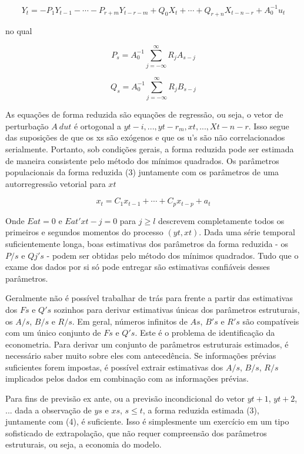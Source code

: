 \documentclass[12pt]{article}
\begin{document}
\begin{equation}
    Y_t = -P_1 Y_{t-1} - \cdots - P_{r+m} Y_{t-r-m} + Q_0 X_t + \cdots + Q_{r+n} X_{t-n-r} + A_0^{-1} u_t
\end{equation}

no qual 

\[
P_s = A_0^{-1} \sum_{j=-\infty}^{\infty} R_j A_{s-j}
\]

\[
Q_s = A_0^{-1} \sum_{j=-\infty}^{\infty} R_j B_{s-j}
\]

As equações de forma reduzida são equações de regressão, ou seja, o vetor de perturbação $A~dut$ é ortogonal a $yt- i , ..., yt-r_m,xt , ..., Xt-n-r$. Isso segue das suposições de que os xs são exógenos e que os u's são não correlacionados serialmente. Portanto, sob condições gerais, a forma reduzida pode ser estimada de maneira consistente pelo método dos mínimos quadrados. Os parâmetros populacionais da forma reduzida (3) juntamente com os parâmetros de uma autorregressão vetorial para $xt$

\[
x_t = C_1 x_{t-1} + \cdots + C_p x_{t-p} + a_t
\]

Onde $Eat = 0$ e $Ea t' x t-j = 0$ para $j \geq l$ descrevem completamente todos os primeiros e segundos momentos do processo $(yt, xt)$. Dada uma série temporal suficientemente longa, boas estimativas dos parâmetros da forma reduzida - os $P/s$ e $Qj's$ - podem ser obtidas pelo método dos mínimos quadrados. Tudo que o exame dos dados por si só pode entregar são estimativas confiáveis desses parâmetros.

Geralmente não é possível trabalhar de trás para frente a partir das estimativas dos $F s$ e $Q's$ sozinhos para derivar estimativas únicas dos parâmetros estruturais, os $A/s$, $B/s$ e $R/s$. Em geral, números infinitos de $As$, $B's$ e $R's$ são compatíveis com um único conjunto de $Fs$ e $Q's$. Este é o problema de identificação da econometria. Para derivar um conjunto de parâmetros estruturais estimados, é necessário saber muito sobre eles com antecedência. Se informações prévias suficientes forem impostas, é possível extrair estimativas dos $A/s$, $B/s$, $R/s$ implicados pelos dados em combinação com as informações prévias.

Para fins de previsão ex ante, ou a previsão incondicional do vetor $yt+1$, $yt+2$, ... dada a observação de $ys$ e $xs$, $s \leq t$, a forma reduzida estimada (3), juntamente com (4), é suficiente. Isso é simplesmente um exercício em um tipo sofisticado de extrapolação, que não requer compreensão dos parâmetros estruturais, ou seja, a economia do modelo.
\end{document}
